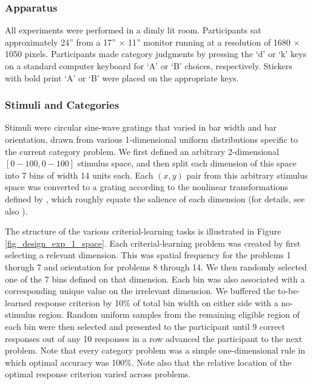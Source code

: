 \documentclass[doc, floatsintext]{apa7}
\begin{document}
\subsubsection{Apparatus}
All experiments were performed in a dimly lit room.
Participants sat approximately 24'' from a 17'' $\times$
11'' monitor running at a resolution of 1680 $\times$ 1050
pixels. Participants made category judgments by pressing the
`d' or `k' keys on a standard computer keyboard for `A' or
`B' choices, respectively. Stickers with bold print `A' or
`B' were placed on the appropriate keys.

\subsubsection{Stimuli and Categories}
Stimuli were circular sine-wave gratings that varied in bar
width and bar orientation, drawn from various 1-dimensional
uniform distributions specific to the current category
problem. We first defined an arbitrary 2-dimensional
$[0-100,0-100]$ stimulus space, and then split each
dimension of this space into 7 bins of width 14 units each.
Each $(x,y)$ pair from this arbitrary stimulus space was
converted to a grating according to the nonlinear
transformations defined by
\textcite{treutwein1989perceptual}, which roughly equate the
salience of each dimension (for details, see also
\textcite{CrossleyAshby2015}).

The structure of the various criterial-learning tasks is
illustrated in Figure \ref{fig_design_exp_1_space}. Each
criterial-learning problem was created by first selecting a
relevant dimension. This was spatial frequency for the
problems 1 thorugh 7 and orientation for problems 8 through
14. We then randomly selected one of the 7 bins defined on
that dimension. Each bin was also associated with a
corresponding unique value on the irrelevant dimension. We
buffered the to-be-learned response criterion by 10\% of
total bin width on either side with a no-stimulus region.
Random uniform samples from the remaining eligible region of
each bin were then selected and presented to the participant
until 9 correct responses out of any 10 responses in a row
advanced the participant to the next problem. Note that
every category problem was a simple one-dimensional rule in
which optimal accuracy was 100\%.  Note also that the
relative location of the optimal response criterion varied
across problems.
\end{document}
